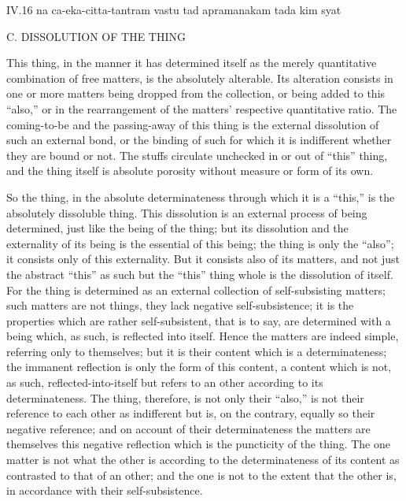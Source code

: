 IV.16
na ca-eka-citta-tantram vastu tad apramanakam tada kim syat

C. DISSOLUTION OF THE THING

This thing, in the manner it has determined itself
as the merely quantitative combination of free matters,
is the absolutely alterable.
Its alteration consists in one or more matters
being dropped from the collection,
or being added to this “also,”
or in the rearrangement of the matters'
respective quantitative ratio.
The coming-to-be and the passing-away of this thing is
the external dissolution of such an external bond,
or the binding of such for which it is indifferent
whether they are bound or not.
The stuffs circulate unchecked in or out of “this” thing,
and the thing itself is absolute porosity
without measure or form of its own.

So the thing, in the absolute determinateness
through which it is a “this,”
is the absolutely dissoluble thing.
This dissolution is an external process of being determined,
just like the being of the thing;
but its dissolution and the externality of its being
is the essential of this being;
the thing is only the “also”;
it consists only of this externality.
But it consists also of its matters,
and not just the abstract “this” as such
but the “this” thing whole is the dissolution of itself.
For the thing is determined as an external collection
of self-subsisting matters;
such matters are not things,
they lack negative self-subsistence;
it is the properties which are rather self-subsistent,
that is to say, are determined with a being
which, as such, is reflected into itself.
Hence the matters are indeed simple, referring only to themselves;
but it is their content which is a determinateness;
the immanent reflection is only the form of this content,
a content which is not, as such, reflected-into-itself
but refers to an other according to its determinateness.
The thing, therefore, is not only their “also,”
is not their reference to each other as indifferent
but is, on the contrary, equally so their negative reference;
and on account of their determinateness
the matters are themselves this negative reflection
which is the puncticity of the thing.
The one matter is not what the other is
according to the determinateness of its content
as contrasted to that of an other;
and the one is not to the extent that the other is,
in accordance with their self-subsistence.

